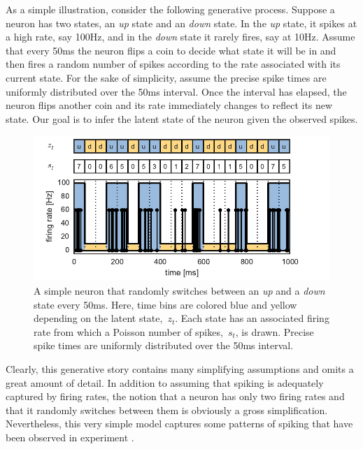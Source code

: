 As a simple illustration, consider the following generative
process. Suppose a neuron has two states, an \emph{up} state and an
\emph{down} state. In the \emph{up} state, it spikes at a high
rate, say 100Hz, and in the \emph{down} state it rarely fires, say at 10Hz.
Assume that every 50ms the neuron flips a coin to decide what state it
will be in and then fires a random number of spikes according to the
rate associated with its current state. For the sake of simplicity, 
assume the precise spike times are uniformly distributed over the 50ms
interval. Once the interval has elapsed, the neuron
flips another coin and its rate immediately changes to reflect its new
state.   Our goal is to infer the latent state of
the neuron given the observed spikes.

\begin{figure}[t]
\centering%
\includegraphics[width=5.5in]{figures/ch2/figure1} 
\caption[Simple neuron with up and down states]{A simple neuron that
  randomly switches between an \textit{up} and a \textit{down} state
  every 50ms. Here, time bins are colored blue and yellow depending on
  the latent state,~$z_t$. Each state has an associated firing rate from
  which a Poisson number of spikes,~$s_t$, is drawn. Precise spike
  times are uniformly distributed over the 50ms interval.}
\label{fig:updown}
\vspace{-0.5cm}
\end{figure}


Clearly, this generative story contains many simplifying assumptions
and omits a great amount of detail. In addition to assuming that
spiking is adequately captured by firing rates, the notion that a
neuron has only two firing rates and that it randomly switches between
them is obviously a gross simplification. Nevertheless, this very
simple model captures some patterns of spiking that have been observed
in experiment \citep{cowan1994spontaneous, shu2003turning}. 

